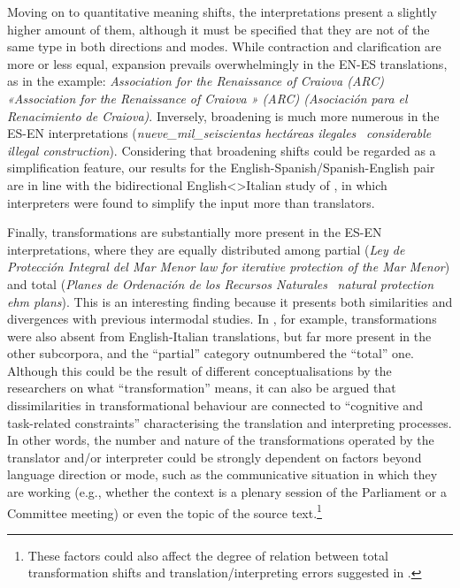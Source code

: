 \documentclass[output=paper]{langscibook}
\begin{document}
Moving on to quantitative meaning shifts, the interpretations present a slightly higher amount of them, although it must be specified that they are not of the same type in both directions and modes. While contraction and clarification are more or less equal, expansion prevails overwhelmingly in the EN-ES translations, as in the example: \textit{Association for the Renaissance of Craiova (ARC)} \rightarrow$\,$ \textit{«Association for the Renaissance of Craiova » (ARC) (Asociación para el Renacimiento de Craiova)}. Inversely, broadening is much more numerous in the ES-EN interpretations (\textit{nueve\_mil\_seiscientas hectáreas ilegales} \rightarrow$\,$ \textit{considerable illegal construction}). Considering that broadening shifts could be regarded as a simplification feature, our results for the English-Spanish/Spanish-English pair are in line with the bidirectional English<>Italian study of \citet{BernardiniEtAl2016}, in which interpreters were found to simplify the input more than translators.

Finally, transformations are substantially more present in the ES-EN interpretations, where they are equally distributed among partial (\textit{Ley de Protección Integral del Mar Menor}  \textit{law for iterative protection of the Mar Menor}) and total (\textit{Planes de Ordenación de los Recursos Naturales} \rightarrow$\,$ \textit{natural protection ehm plans}). This is an interesting finding because it presents both similarities and divergences with previous intermodal studies. In \citet{Bernardini2016}, for example, transformations were also absent from English-Italian translations, but far more present in the other subcorpora, and the “partial” category outnumbered the “total” one. Although this could be the result of different conceptualisations by the researchers on what “transformation” means, it can also be argued that dissimilarities in transformational behaviour are connected to   “cognitive and task-related constraints” characterising the translation and interpreting processes. In other words, the number and nature of the transformations operated by the translator and/or interpreter could be strongly dependent on factors beyond language direction or mode, such as the communicative situation in which they are working (e.g., whether the context is a plenary session of the Parliament or a Committee meeting) or even the topic of the source text.\footnote{These factors could also affect the degree of relation between total transformation shifts and translation/interpreting errors suggested in .}
\end{document}
